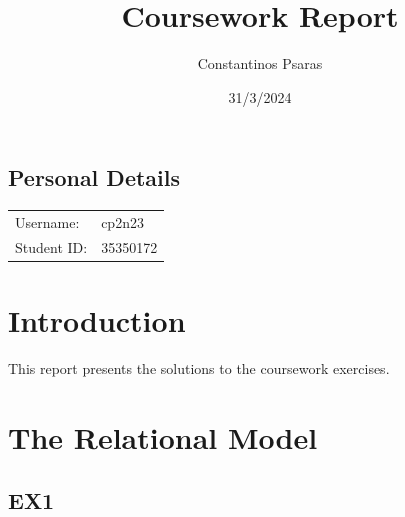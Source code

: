 \documentclass[12pt,oneside,a4paper,english]{article}
\title{Coursework Report}
\author{Constantinos Psaras}
\date{31/3/2024}
\newcommand{\username}{cp2n23}
\newcommand{\studentid}{35350172}
\begin{document}
\maketitle
\begin{center}
\section*{Personal Details}
\begin{tabular}{ll}
    Username: & \username \\
    Student ID: & \studentid \\
\end{tabular}
\end{center}
\newpage

\section*{Introduction}
This report presents the solutions to the coursework exercises.

\section{The Relational Model}
\subsection{EX1}
\end{document}
